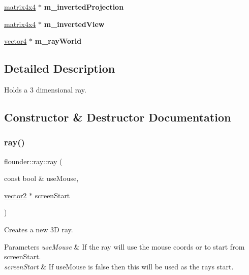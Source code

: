 \begin{DoxyCompactItemize}
\item 
\mbox{\label{classflounder_1_1ray_ae9ea495f09833c26124017cfbc13cb2e}} 
\hyperlink{classflounder_1_1matrix4x4}{matrix4x4} $\ast$ {\bfseries m\+\_\+inverted\+Projection}
\item 
\mbox{\label{classflounder_1_1ray_abf3da66dbe2079a9cfe4eb09c2bb5f78}} 
\hyperlink{classflounder_1_1matrix4x4}{matrix4x4} $\ast$ {\bfseries m\+\_\+inverted\+View}
\item 
\mbox{\label{classflounder_1_1ray_a219e9b5ea7681efc7e1ac98903a159ed}} 
\hyperlink{classflounder_1_1vector4}{vector4} $\ast$ {\bfseries m\+\_\+ray\+World}
\end{DoxyCompactItemize}


\subsection{Detailed Description}
Holds a 3 dimensional ray. 



\subsection{Constructor \& Destructor Documentation}
\mbox{\label{classflounder_1_1ray_adc2baacdaf66bd982c3b48827d53d103}} 
\subsubsection{\texorpdfstring{ray()}{ray()}}
{\footnotesize\ttfamily flounder\+::ray\+::ray (\begin{DoxyParamCaption}\item[{const bool \&}]{use\+Mouse,  }\item[{\hyperlink{classflounder_1_1vector2}{vector2} $\ast$}]{screen\+Start }\end{DoxyParamCaption})}



Creates a new 3D ray. 


\begin{DoxyParams}{Parameters}
{\em use\+Mouse} & If the ray will use the mouse coords or to start from screen\+Start. \\
\hline
{\em screen\+Start} & If use\+Mouse is false then this will be used as the rays start. \\
\hline
\end{DoxyParams}
\mbox{\label{classflounder_1_1ray_a22e1374c250bbad557f01428b95d7fe1}} 
